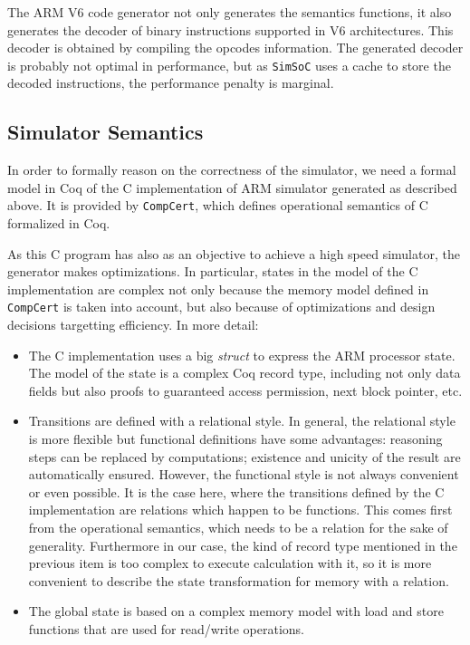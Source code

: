 \documentclass[a4paper, conference]{IEEEtran}
\newcommand{\compcert}{\texttt{CompCert}\xspace}
\newcommand{\simsoc}{\texttt{SimSoC}\xspace}
\newcommand{\compcert}{Compcert\xspace}
\begin{document}
The ARM V6 code generator not only generates the semantics functions,
it also generates the decoder of binary instructions supported in V6
architectures. This decoder is obtained by compiling the opcodes
information. The generated decoder is probably not optimal in
performance, but as \simsoc uses a cache to store the decoded
instructions, the performance penalty is marginal.

\subsection{Simulator Semantics}

In order to formally reason on the correctness of the simulator, we
need a formal model in Coq of the C implementation of ARM simulator
generated as described above.  It is provided by \compcert, which
defines operational semantics of C formalized in Coq.

As this C program has also as an objective to achieve a high speed
simulator, the generator makes optimizations. In particular, states in
the model of the C implementation are complex not only
because the memory model defined in \compcert is taken into account,
but also because of optimizations and design decisions
targetting efficiency.  In more detail:
\begin{itemize}
\item The C implementation uses a big \emph{struct} to express the ARM
  processor state.  The model of the state is a complex Coq record
  type, including not only data fields but also proofs to guaranteed
  access permission, next block pointer, etc.
\item Transitions are defined with a relational style.  In general,
  the relational style is more flexible but functional definitions
  have some advantages: reasoning steps can be replaced by
  computations; existence and unicity of the result are automatically
  ensured.  However, the functional style is not always convenient or
  even possible.  It is the case here, where the transitions defined
  by the C implementation are relations which happen to be functions.
  This comes first from the operational semantics, which needs to be
  a relation for the sake of generality.  Furthermore in our case, the
  kind of record type mentioned in the previous item is too complex to
  execute calculation with it, so it is more convenient to describe
  the state transformation for memory with a relation.
\item
The global state is based on a complex memory model
with load and store functions that are used for read/write operations.
\end{itemize}
\end{document}
